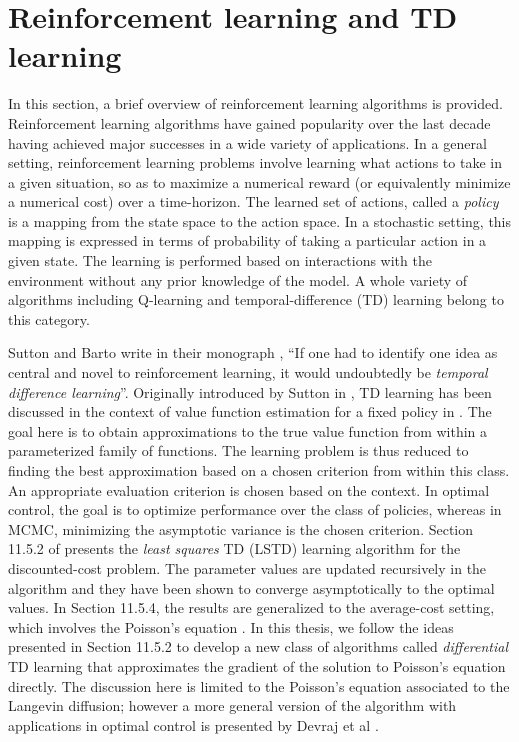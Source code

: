 

\section{Reinforcement learning and TD learning}
\label{rl_td}
In this section, a brief overview of reinforcement learning algorithms is provided. Reinforcement learning algorithms have gained popularity over the last decade having achieved major successes in a wide variety of applications. In a general setting, reinforcement learning problems involve learning what actions to take in a given situation, so as to maximize a numerical reward (or equivalently minimize a numerical cost) over a time-horizon. The learned set of actions, called a \textit{policy} is a mapping from the state space to the action space. In a stochastic setting, this mapping is expressed in terms of probability of taking a particular action in a given state. The learning is performed based on interactions with the environment without any prior knowledge of the model. A whole variety of algorithms including Q-learning \cite{watday92a} and temporal-difference (TD) learning \cite{sut88} belong to this category. 

Sutton and Barto write in their monograph \cite{sutbar98}, ``If one had to identify one idea as central and novel to reinforcement learning, it would undoubtedly be \textit{temporal difference learning}''. Originally introduced by Sutton in \cite{sut88}, TD learning has been discussed in the context of value function estimation for a fixed policy in \cite{ctcn}. The goal here is to obtain approximations to the true value function from within a parameterized family of functions. The learning problem is thus reduced to finding the best approximation based on a chosen criterion from within this class. An appropriate evaluation criterion is chosen based on the context. In optimal control, the goal is to optimize performance over the class of policies, whereas in MCMC, minimizing the asymptotic variance is the chosen criterion. Section 11.5.2 of \cite{ctcn} presents the \textit{least squares} TD (LSTD) learning algorithm for the discounted-cost problem. The parameter values are updated recursively in the algorithm and they have been shown to converge asymptotically to the optimal values. In Section 11.5.4, the results are generalized to the average-cost setting, which involves the Poisson's equation . In this thesis, we follow the ideas presented in Section 11.5.2 to develop a new class of algorithms called \textit{differential} TD learning that approximates the gradient of the solution to Poisson's equation directly. The discussion here is limited to the Poisson's equation associated to the Langevin diffusion; however a more general version of the algorithm with applications in optimal control is presented by Devraj et al \cite{devmey16arXiv}.
 
